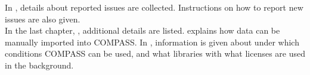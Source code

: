 In , details about reported issues are collected. Instructions on how to report new issues are also given. \\

In the last chapter, , additional details are listed.  explains how data can be manually imported into COMPASS. In , information is given about under which conditions COMPASS can be used, and what libraries with what licenses are used in the background.

\pagebreak










